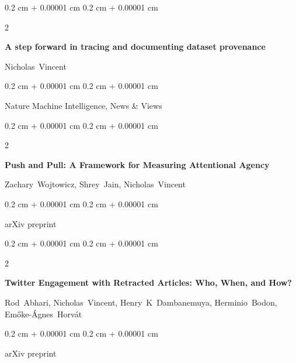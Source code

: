\documentclass[10pt, letterpaper]{article}
\newenvironment{onecolentry}{
    \begin{adjustwidth}{
        0.2 cm + 0.00001 cm
    }{
        0.2 cm + 0.00001 cm
    }
}{
    \end{adjustwidth}
} %
\newenvironment{twocolentry}[2][]{
    \onecolentry
    \def\secondColumn{#2}
    \setcolumnwidth{\fill, 4.1 cm}
    \begin{paracol}{2}
}{
    \switchcolumn \raggedleft \secondColumn
    \end{paracol}
    \endonecolentry
} %
\begin{document}
        \begin{samepage}
            \begin{twocolentry}{
                2024
            }
                \textbf{A step forward in tracing and documenting dataset provenance}

                \vspace{0.10 cm}

                \mbox{Nicholas Vincent}
            \end{twocolentry}


            \vspace{0.10 cm}

            \begin{onecolentry}
        Nature Machine Intelligence, News \& Views    \end{onecolentry}
        \end{samepage}

        \vspace{0.2 cm}

        \begin{samepage}
            \begin{twocolentry}{
                2024
            }
                \textbf{Push and Pull: A Framework for Measuring Attentional Agency}

                \vspace{0.10 cm}

                \mbox{Zachary Wojtowicz}, \mbox{Shrey Jain}, \mbox{Nicholas Vincent}
            \end{twocolentry}


            \vspace{0.10 cm}

            \begin{onecolentry}
        arXiv preprint    \end{onecolentry}
        \end{samepage}

        \vspace{0.2 cm}

        \begin{samepage}
            \begin{twocolentry}{
                2022
            }
                \textbf{Twitter Engagement with Retracted Articles: Who, When, and How?}

                \vspace{0.10 cm}

                \mbox{Rod Abhari}, \mbox{Nicholas Vincent}, \mbox{Henry K Dambanemuya}, \mbox{Herminio Bodon}, \mbox{Emőke-Ágnes Horvát}
            \end{twocolentry}


            \vspace{0.10 cm}

            \begin{onecolentry}
        arXiv preprint    \end{onecolentry}
        \end{samepage}
\end{document}
